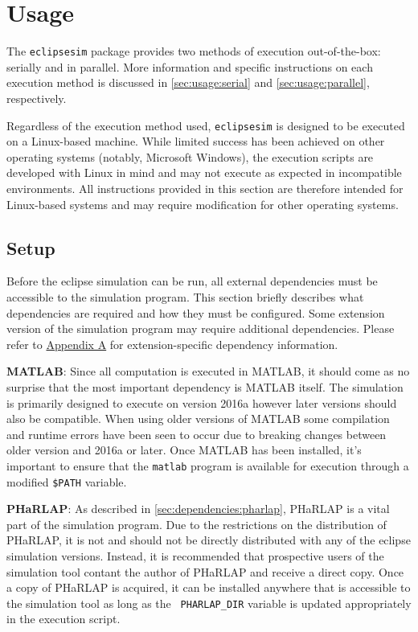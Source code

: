 \documentclass[12pt,letterpaper]{article}
\begin{document}
%
%
\section{Usage}
\label{sec:usage}

The \texttt{eclipsesim} package provides two methods of execution
out-of-the-box: serially and in parallel. More information and specific
instructions on each execution method is discussed in \autoref{sec:usage:serial}
and \autoref{sec:usage:parallel}, respectively.

Regardless of the execution method used, \texttt{eclipsesim} is designed to be
executed on a Linux-based machine. While limited success has been achieved on
other operating systems (notably, Microsoft Windows), the execution scripts are
developed with Linux in mind and may not execute as expected in incompatible
environments. All instructions provided in this section are therefore intended
for Linux-based systems and may require modification for other operating
systems.

\subsection{Setup}
\label{sec:usage:setup}

Before the eclipse simulation can be run, all external dependencies must be
accessible to the simulation program. This section briefly describes what
dependencies are required and how they must be configured. Some extension
version of the simulation program may require additional dependencies. Please
refer to \hyperref[sec:extensions]{Appendix A} for extension-specific dependency
information.

{\bf MATLAB}: Since all computation is executed in MATLAB, it should come as no
surprise that the most important dependency is MATLAB itself. The simulation is
primarily designed to execute on version 2016a however later versions should
also be compatible. When using older versions of MATLAB some compilation and
runtime errors have been seen to occur due to breaking changes between older
version and 2016a or later. Once MATLAB has been installed, it's important to
ensure that the {\tt matlab} program is available for execution through a
modified {\tt \$PATH} variable.

{\bf PHaRLAP}: As described in \autoref{sec:dependencies:pharlap}, PHaRLAP is a
vital part of the simulation program. Due to the restrictions on the
distribution of PHaRLAP, it is not and should not be directly distributed with
any of the eclipse simulation versions. Instead, it is recommended that
prospective users of the simulation tool contant the author of PHaRLAP and
receive a direct copy. Once a copy of PHaRLAP is acquired, it can be installed
anywhere that is accessible to the simulation tool as long as the {\tt
  PHARLAP\_DIR} variable is updated appropriately in the execution script.
\end{document}
